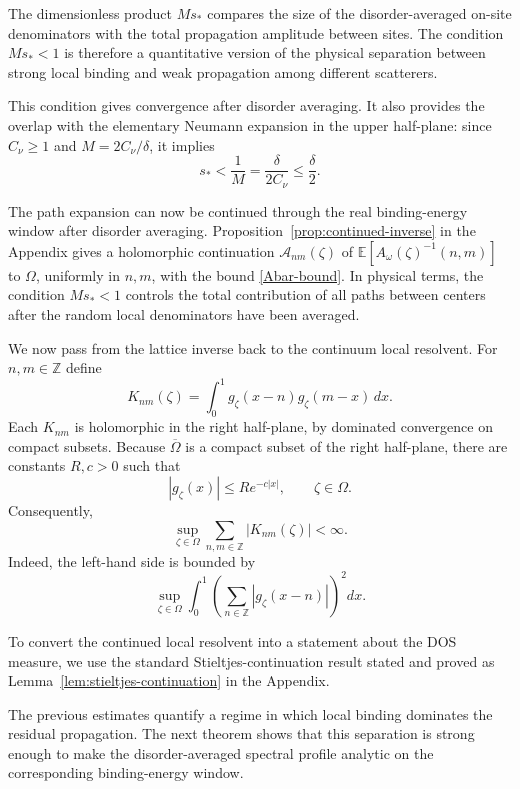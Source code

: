 \documentclass[12pt,a4paper]{article}
\numberwithin{equation}{section}
\newcommand{\E}{\mathbb E}
\newcommand{\Z}{\mathbb Z}
\newcommand{\cA}{\mathcal A}
\newcommand{\Om}{\Omega}
\begin{document}
The dimensionless product $Ms_*$ compares the size of the disorder-averaged
on-site denominators with the total propagation amplitude between sites.  The
condition $Ms_*<1$ is therefore a quantitative version of the physical
separation between strong local binding and weak propagation among different
scatterers.

This condition gives convergence after disorder averaging.  It also provides
the overlap with the elementary Neumann expansion in the upper half-plane:
since $C_\nu\ge1$ and $M=2C_\nu/\delta$, it implies
\begin{equation}
 s_*<\frac{1}{M}=\frac{\delta}{2C_\nu}
 \le\frac{\delta}{2}.
\label{overlap-consequence}
\end{equation}

The path expansion can now be continued through the real binding-energy
window after disorder averaging.  Proposition~\ref{prop:continued-inverse} in the Appendix gives a holomorphic continuation
$\cA_{nm}(\zeta)$ of
$\E[A_\omega(\zeta)^{-1}(n,m)]$ to $\Om$, uniformly in $n,m$, with the
bound \eqref{Abar-bound}.  In physical terms, the condition $Ms_*<1$ controls
the total contribution of all paths between centers after the random local
denominators have been averaged.

We now pass from the lattice inverse back to the continuum local resolvent.
For $n,m\in\Z$ define
\begin{equation}
K_{nm}(\zeta)
 =\int_0^1 g_\zeta(x-n)g_\zeta(m-x)\,d x.
\label{Knm}
\end{equation}
Each $K_{nm}$ is holomorphic in the right half-plane, by dominated
convergence on compact subsets.  Because $\overline\Om$ is a compact subset
of the right half-plane, there
are constants $R,c>0$ such that
\begin{equation}
|g_\zeta(x)|\le R e^{-c|x|},
\qquad \zeta\in\Om.
\label{g-uniform}
\end{equation}
Consequently,
\begin{equation}
\sup_{\zeta\in\Om}
\sum_{n,m\in\Z}|K_{nm}(\zeta)|<\infty.
\label{K-sum}
\end{equation}
Indeed, the left-hand side is bounded by
$$
\sup_{\zeta\in\Om}
\int_0^1
\left(\sum_{n\in\Z}|g_\zeta(x-n)|\right)^2d x.
$$

To convert the continued local resolvent into a statement about the DOS
measure, we use the standard Stieltjes-continuation result stated and proved
as Lemma~\ref{lem:stieltjes-continuation} in the Appendix.

The previous estimates quantify a regime in which local binding dominates the
residual propagation.  The next theorem shows that this separation is strong
enough to make the disorder-averaged spectral profile analytic on the
corresponding binding-energy window.
\end{document}
